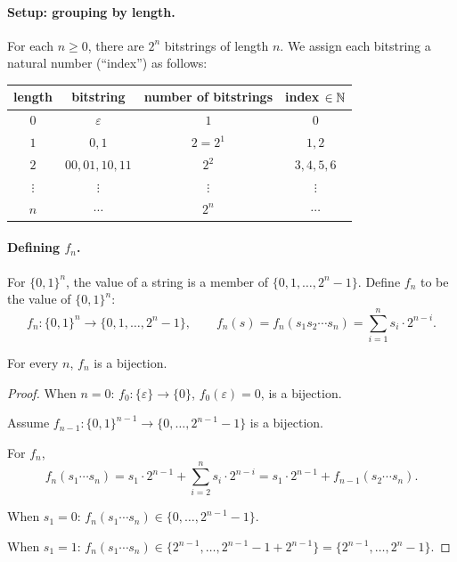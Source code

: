 \documentclass[11pt]{article}
\begin{document}
\begin{solution}[(a)]

\paragraph{Setup: grouping by length.} For each $n\ge0$, there are $2^n$
bitstrings of length $n$. We assign each bitstring a natural number
(``index'') as follows:

\begin{center}
\begin{tabular}{c c c c}
\hline
length & bitstring & number of bitstrings & index $\in \mathbb{N}$ \\
\hline
$0$ & $\varepsilon$ & $1$ & $0$ \\
$1$ & $0,1$ & $2=2^1$ & $1,2$ \\
$2$ & $00,01,10,11$ & $2^2$ & $3,4,5,6$ \\
$\vdots$ & $\vdots$ & $\vdots$ & $\vdots$ \\
$n$ & $\cdots$ & $2^n$ & $\cdots$ \\
\hline
\end{tabular}
\end{center}

\paragraph{Defining $f_n$.} For $\{0,1\}^n$, the value of a string is a
member of $\{0,1,\dots,2^n-1\}$. Define $f_n$ to be the value of
$\{0,1\}^n$:
\[
    f_n : \{0,1\}^n \longrightarrow \{0,1,\dots,2^n-1\}, \qquad
    f_n(s) = f_n(s_1 s_2 \cdots s_n) = \sum_{i=1}^n s_i\cdot 2^{n-i}.
\]

\begin{claim}
    For every $n$, $f_n$ is a bijection.
\end{claim}
\begin{proof}
    When $n=0$: $f_0:\{\varepsilon\}\to\{0\}$, $f_0(\varepsilon)=0$, is a
    bijection.

    Assume $f_{n-1}:\{0,1\}^{n-1}\to\{0,\dots,2^{n-1}-1\}$ is a bijection.

    For $f_n$,
    \[
        f_n(s_1\cdots s_n) = s_1\cdot 2^{n-1} + \sum_{i=2}^n s_i\cdot 2^{n-i}
        = s_1\cdot 2^{n-1} + f_{n-1}(s_2\cdots s_n).
    \]

    When $s_1=0$: $f_n(s_1\cdots s_n)\in\{0,\dots,2^{n-1}-1\}$.

    When $s_1=1$: $f_n(s_1\cdots s_n) \in \{2^{n-1},\dots,2^{n-1}-1+2^{n-1}\}
    = \{2^{n-1},\dots,2^n-1\}$.


\end{proof}
\end{solution}
\end{document}

